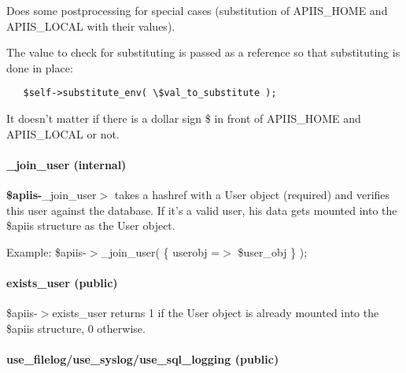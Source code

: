 Does some postprocessing for special cases (substitution of APIIS\_HOME and
APIIS\_LOCAL with their values).



The value to check for substituting is passed as a reference so that
substituting is done in place:

\begin{verbatim}
   $self->substitute_env( \$val_to_substitute );
\end{verbatim}


It doesn't matter if there is a dollar sign \$ in front of APIIS\_HOME and
APIIS\_LOCAL or not.

\paragraph*{\_join\_user (internal)\label{Apiis::Init_--_Basic_initialisation_object_for_the_complete_APIIS_structure__join_user_internal_}}


\textbf{\$apiis-}\_join\_user$>$ takes a hashref with a User object (required) and
verifies this user against the database. If it's a valid user, his data gets
mounted into the \$apiis structure as the User object.



Example:
   \$apiis-$>$\_join\_user( \{ userobj =$>$ \$user\_obj \} );

\paragraph*{exists\_user (public)\label{Apiis::Init_--_Basic_initialisation_object_for_the_complete_APIIS_structure_exists_user_public_}}


\$apiis-$>$exists\_user returns 1 if the User object is already mounted into the
\$apiis structure, 0 otherwise.

\paragraph*{use\_filelog/use\_syslog/use\_sql\_logging (public)\label{Apiis::Init_--_Basic_initialisation_object_for_the_complete_APIIS_structure_use_filelog_use_syslog_use_sql_logging_public_}}


